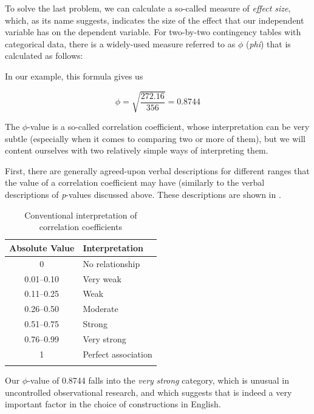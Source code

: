 To solve the last problem, we can calculate a so\hyp{}called measure of \textit{effect size},  which, as its name suggests, indicates the size of the effect that our independent variable has on the dependent variable. For two\hyp{}by\hyp{}two contingency  tables with categorical  data, there is a widely\hyp{}used measure referred to as $\phi$ (\textit{phi}) that is calculated as follows:

\begin{exe}
\ex {}
\end{exe}

In our example, this formula gives us

\[\phi = \sqrt{\frac{272.16}{356}} = 0.8744\]

The $\phi$-value is a so\hyp{}called correlation  coefficient, whose interpretation can be very subtle (especially when it comes to comparing two or more of them), but we will content ourselves with two relatively simple ways of interpreting them.

First, there are generally agreed\hyp{}upon verbal descriptions for different ranges that the value of a correlation  coefficient may have (similarly to the verbal descriptions of \textit{p}-values discussed above. These descriptions are shown in .

\begin{table}
\caption{Conventional interpretation of correlation coefficients\label{tab:correlationlevels}}
\begin{tabular}[t]{cl}
\lsptoprule
Absolute Value & Interpretation \\
\midrule
0 & No relationship \\
0.01--0.10 & Very weak \\
0.11--0.25 & Weak \\
0.26--0.50 & Moderate \\
0.51--0.75 & Strong \\
0.76--0.99 & Very strong \\
1 & Perfect association \\
\lspbottomrule
\end{tabular}
\end{table}

Our $\phi$-value of 0.8744 falls into the \textit{very} \textit{strong} category, which is unusual in uncontrolled observational  research, and which suggests that  is indeed a very important factor in the choice of   constructions in English.

